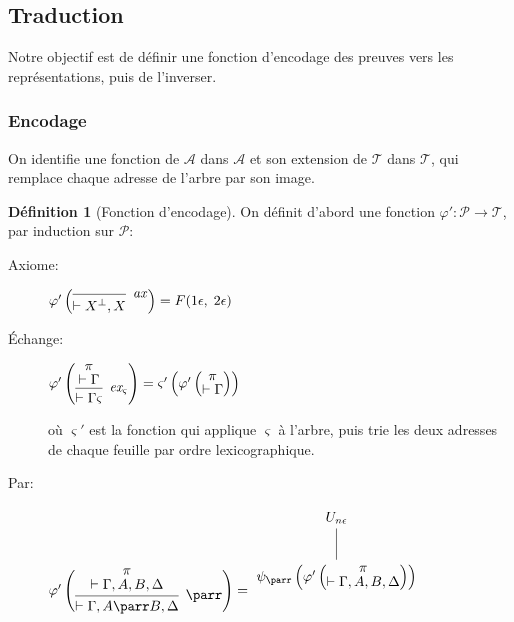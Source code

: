 \documentclass[11pt,a4paper]{article}
\theoremstyle{plain}
\theoremstyle{definition}
\newtheorem{definition}{Définition}
\theoremstyle{remark}
\newcommand*{\orth}{^\perp}
\newcommand*{\namedproofv}[2]{\hypo{#1}\infer[no rule]{1}{\vdash #2}}
\newcommand*{\axv}[1]{\infer{0}[\ensuremath{\mathit{ax}}]{\vdash #1}}
\newcommand*{\parrv}[1]{\infer{1}[\ensuremath{\parr}]{\vdash #1}}
\newcommand*{\permv}[2]{\infer{1}[\ensuremath{\textit{ex}_{#1}}]{\vdash #2}}
\newcommand*{\permapp}[2]{#2 #1}
\newcommand*{\someperm}{\varsigma}
\newcommand*{\sequent}{\Gamma}
\newcommand*{\proofs}{\ensuremath{\mathcal{P}}}
\newcommand*{\addresses}{\ensuremath{\mathcal{A}}}
\newcommand*{\trees}{\ensuremath{\mathcal{T}}}
\newcommand*{\encode}{\ensuremath{\varphi}}
\begin{document}
\subsection{Traduction}
Notre objectif est de définir une fonction d'encodage des preuves vers les représentations, puis de l'inverser.

\subsubsection{Encodage}

On identifie une fonction de $\addresses$ dans $\addresses$ et son extension de $\trees$ dans $\trees$, qui remplace chaque adresse de l'arbre par son image.

\begin{definition}[Fonction d'encodage]
  On définit d'abord une fonction $\encode' : \proofs \rightarrow \trees$, par induction sur $\proofs$:
    \begin{description}
    \item[Axiome:]
    $\encode' \left(
    \begin{prooftree}
        \axv{{X}\orth, X}
    \end{prooftree}
    \right) = F(1 \epsilon, \; 2 \epsilon)$

    \item[Échange:]
    $\encode' \left(
    \begin{prooftree}
      \namedproofv{\pi}{\sequent}
      \permv{\someperm}{\permapp{\someperm}{\sequent}}
    \end{prooftree}
    \right) = \someperm' \left( \encode ' \left(
           \begin{prooftree}
             \namedproofv{\pi}{\sequent}
           \end{prooftree} \right) \right)$
           
    où $\someperm'$ est la fonction qui applique $\someperm$ à l'arbre, puis trie les deux adresses de chaque feuille par ordre lexicographique.

    \item[Par:]
    $\encode' \left(
    \begin{prooftree}
      \namedproofv{\pi}{\sequent, A, B, \Delta}
      \parrv{\sequent, A \parr B, \Delta}
    \end{prooftree}
    \right) = \begin{tikzpicture}%
    [level distance=1.5cm,
    level 2/.style={sibling distance=3.5cm}]
    \node {$U_{n \epsilon}$}
        child {node {$\psi_\parr \left( \encode' \left(
           \begin{prooftree}
             \namedproofv{\pi}{\sequent, A, B, \Delta}
           \end{prooftree} \right) \right)$}
    };
    \end{tikzpicture}$
    

\end{description}
\end{definition}
\end{document}
